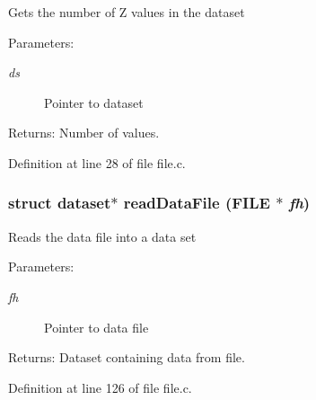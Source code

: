 Gets the number of Z values in the dataset

\begin{Desc}
\item[Parameters:]
\begin{description}
\item[{\em ds}]Pointer to dataset \end{description}
\end{Desc}
\begin{Desc}
\item[Returns:]Number of values. \end{Desc}


Definition at line 28 of file file.c.
\subsubsection{\setlength{\rightskip}{0pt plus 5cm}struct {\bf dataset}$\ast$ read\-Data\-File (FILE $\ast$ {\em fh})}\label{file_8h_a4}


Reads the data file into a data set

\begin{Desc}
\item[Parameters:]
\begin{description}
\item[{\em fh}]Pointer to data file \end{description}
\end{Desc}
\begin{Desc}
\item[Returns:]Dataset containing data from file. \end{Desc}


Definition at line 126 of file file.c.